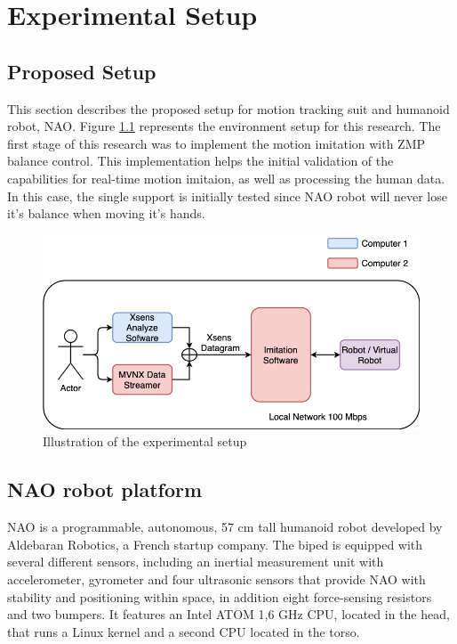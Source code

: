 \chapter{Experimental Setup}
\label{chapter-5}

\section{Proposed Setup}

This section describes the proposed setup for motion tracking suit and humanoid robot, NAO. Figure \ref{fig: experimental-setup} represents the environment setup for this research.
The first stage of this research was to implement the motion imitation with ZMP balance control. This implementation helps the initial validation of the capabilities for real-time motion imitaion, 
as well as processing the human data. In this case, the single support is initially tested since NAO robot will never lose it's balance when moving it's hands.

\begin{figure}[h!]
    \centering
    \includegraphics[scale=0.5]{images/flowchart-experimental-setup.png}\hfill
    \caption{Illustration of the experimental setup}\hfill
    \label{fig: experimental-setup}
\end{figure}

\section{NAO robot platform}


NAO is a programmable, autonomous, 57 cm tall humanoid robot developed by Aldebaran Robotics, a French startup company. The biped is equipped with several
different sensors, including an inertial measurement unit with accelerometer, gyrometer and four ultrasonic sensors that provide NAO with stability and 
positioning within space, in addition eight force-sensing resistors and two bumpers. It features an Intel ATOM 1,6 GHz CPU, located in the head, that runs
 a Linux kernel and a second CPU located in the torso.


